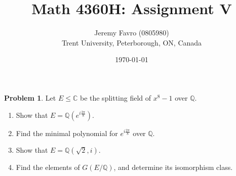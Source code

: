 \documentclass[10pt]{article}
\title{Math 4360H: Assignment V}
\author{Jeremy Favro (0805980) \\ Trent University, Peterborough, ON, Canada}
\date{\today}
\theoremstyle{definition}
\newtheorem{problem}{Problem}
\begin{document}
\maketitle

\begin{problem}
Let $E\leq \mathbb{C}$ be the splitting field of $x^8-1$ over $\mathbb{Q}$.
\begin{enumerate}[label=(\alph*)]
  \item Show that $E=\mathbb{Q}(e^{i\frac{2\pi}{8}})$.
  \item Find the minimal polynomial for $e^{i\frac{2\pi}{8}}$ over $\mathbb{Q}$.
  \item Show that $E=\mathbb{Q}(\sqrt{2},i)$.
  \item Find the elements of $G(E/\mathbb{Q})$, and determine its isomorphism class.
\end{enumerate}
\end{problem}
\end{document}

